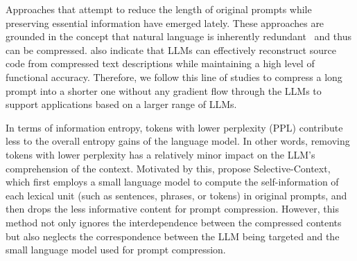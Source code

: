Approaches that attempt to reduce the length of original prompts while preserving essential information have emerged lately. %
These approaches are grounded in the concept that natural language is inherently redundant~\cite{shannon1951prediction} and thus can be compressed. 
\citet{gilbert2023semantic} also indicate that LLMs can effectively reconstruct source code from compressed text descriptions while maintaining a high level of functional accuracy.
Therefore, we follow this line of studies to compress a long prompt into a shorter one without any gradient flow through the LLMs to support applications based on a larger range of LLMs.


In terms of information entropy, tokens with lower perplexity (PPL) contribute less to the overall entropy gains of the language model.
In other words, removing tokens with lower perplexity has a relatively minor impact on the LLM's comprehension of the context.
Motivated by this, \citet{li2023unlocking} propose Selective-Context, which first employs a small language model to compute the self-information of each lexical unit (such as sentences, phrases, or tokens) in original prompts, and then drops the less informative content for prompt compression.
However, this method not only ignores the interdependence between the compressed contents but also neglects the correspondence between the LLM being targeted and the small language model used for prompt compression. %


